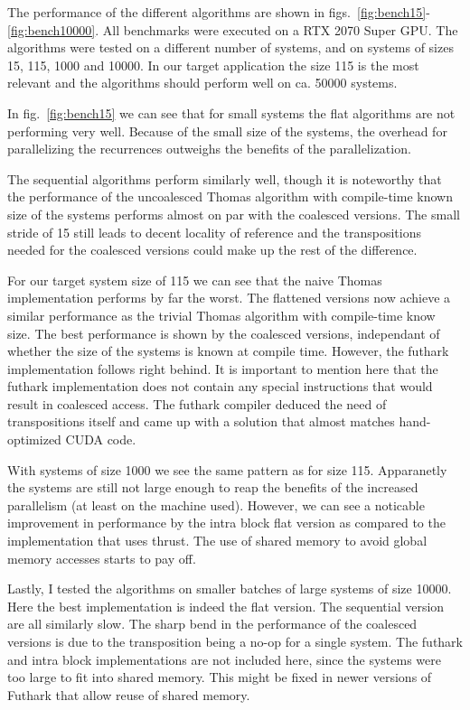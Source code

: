 \documentclass[a4paper,oneside]{memoir}
\begin{document}
The performance of the different algorithms are shown in figs.~\ref{fig:bench15}-\ref{fig:bench10000}. All benchmarks were executed on a RTX 2070 Super GPU. 
The algorithms were tested on a different number of systems, and on systems of sizes 15, 115, 1000 and 10000. In our target application the size 115 is the most relevant and the algorithms should perform well on ca. 50000 systems.

In fig.~\ref{fig:bench15} we can see that for small systems the flat algorithms are not performing very well. Because of the small size of the systems, the overhead for parallelizing the recurrences outweighs the benefits of the parallelization.

The sequential algorithms perform similarly well, though it is noteworthy that the performance of the uncoalesced Thomas algorithm with compile-time known size of the systems performs almost on par with the coalesced versions. The small stride of 15 still leads to decent locality of reference and the transpositions needed for the coalesced versions could make up the rest of the difference.

For our target system size of 115 we can see that the naive Thomas implementation performs by far the worst. The flattened versions now achieve a similar performance as the trivial Thomas algorithm with compile-time know size.
The best performance is shown by the coalesced versions, independant of whether the size of the systems is known at compile time. However, the futhark implementation follows right behind. It is important to mention here that the futhark implementation does not contain any special instructions that would result in coalesced access. The futhark compiler deduced the need of transpositions itself and came up with a solution that almost matches hand-optimized CUDA code.

With systems of size 1000 we see the same pattern as for size 115. Apparanetly the systems are still not large enough to reap the benefits of the increased parallelism (at least on the machine used). However, we can see a noticable improvement in performance by the intra block flat version as compared to the implementation that uses thrust. The use of shared memory to avoid global memory accesses starts to pay off.

Lastly, I tested the algorithms on smaller batches of large systems of size 10000. Here the best implementation is indeed the flat version. The sequential version are all similarly slow. The sharp bend in the performance of the coalesced versions is due to the transposition being a no-op for a single system.
The futhark and intra block implementations are not included here, since the systems were too large to fit into shared memory. This might be fixed in newer versions of Futhark that allow reuse of shared memory.
\end{document}
